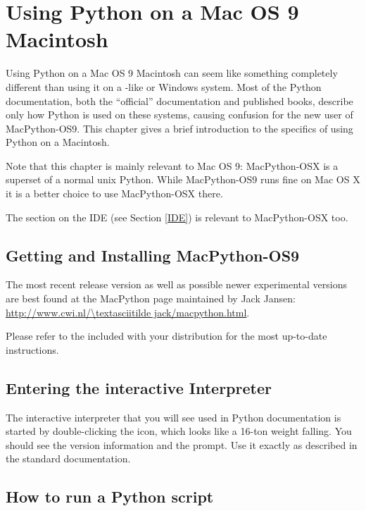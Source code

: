 \chapter{Using Python on a Mac OS 9 Macintosh \label{using}}

Using Python on a Mac OS 9 Macintosh can seem like something completely
different than using it on a \UNIX-like or Windows system. Most of the
Python documentation, both the ``official'' documentation and
published books, describe only how Python is used on these systems,
causing confusion for the new user of MacPython-OS9. This chapter gives a
brief introduction to the specifics of using Python on a Macintosh.

Note that this chapter is mainly relevant to Mac OS 9: MacPython-OSX
is a superset of a normal unix Python. While MacPython-OS9 runs fine
on Mac OS X it is a better choice to use MacPython-OSX there.

The section on the IDE (see Section \ref{IDE}) is relevant to MacPython-OSX
too.

\section{Getting and Installing MacPython-OS9 \label{getting}}

The most recent release version as well as possible newer experimental
versions are best found at the MacPython page maintained by Jack
Jansen: \url{http://www.cwi.nl/\textasciitilde jack/macpython.html}.


Please refer to the  included with your distribution for
the most up-to-date instructions.


\section{Entering the interactive Interpreter
         \label{interpreter}}

The interactive interpreter that you will see used in Python
documentation is started by double-clicking the
 icon, which looks like a 16-ton weight
falling. You should see the version information and the
\samp{>\code{>}>~} prompt.  Use it exactly as described in the
standard documentation.


\section{How to run a Python script}

